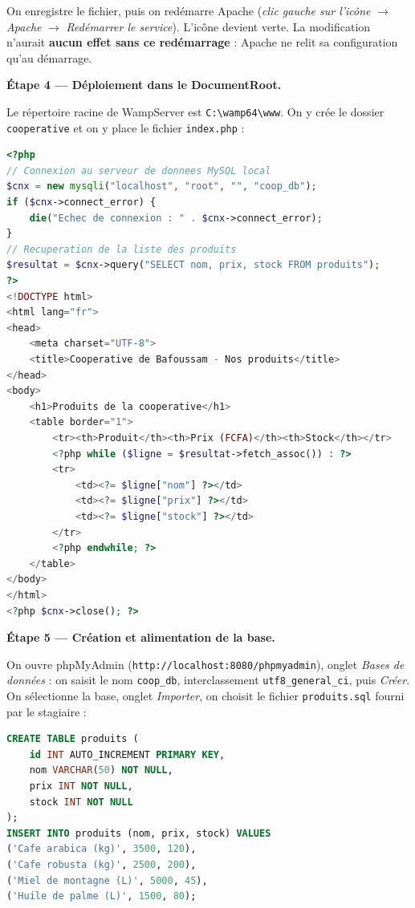 \documentclass[11pt]{article}
\begin{document}
\begin{exoresolu}
On enregistre le fichier, puis on redémarre Apache (\emph{clic gauche sur l'icône} $\rightarrow$ \emph{Apache} $\rightarrow$ \emph{Redémarrer le service}). L'icône devient verte. La modification n'aurait \textbf{aucun effet sans ce redémarrage} : Apache ne relit sa configuration qu'au démarrage.

\textbf{Étape 4 — Déploiement dans le DocumentRoot.}

Le répertoire racine de WampServer est \texttt{C:\textbackslash wamp64\textbackslash www}. On y crée le dossier \texttt{cooperative} et on y place le fichier \texttt{index.php} :

\begin{lstlisting}[language=Php]
<?php
// Connexion au serveur de donnees MySQL local
$cnx = new mysqli("localhost", "root", "", "coop_db");
if ($cnx->connect_error) {
    die("Echec de connexion : " . $cnx->connect_error);
}
// Recuperation de la liste des produits
$resultat = $cnx->query("SELECT nom, prix, stock FROM produits");
?>
<!DOCTYPE html>
<html lang="fr">
<head>
    <meta charset="UTF-8">
    <title>Cooperative de Bafoussam - Nos produits</title>
</head>
<body>
    <h1>Produits de la cooperative</h1>
    <table border="1">
        <tr><th>Produit</th><th>Prix (FCFA)</th><th>Stock</th></tr>
        <?php while ($ligne = $resultat->fetch_assoc()) : ?>
        <tr>
            <td><?= $ligne["nom"] ?></td>
            <td><?= $ligne["prix"] ?></td>
            <td><?= $ligne["stock"] ?></td>
        </tr>
        <?php endwhile; ?>
    </table>
</body>
</html>
<?php $cnx->close(); ?>
\end{lstlisting}

\textbf{Étape 5 — Création et alimentation de la base.}

On ouvre phpMyAdmin (\texttt{http://localhost:8080/phpmyadmin}), onglet \emph{Bases de données} : on saisit le nom \texttt{coop\_db}, interclassement \texttt{utf8\_general\_ci}, puis \emph{Créer}. On sélectionne la base, onglet \emph{Importer}, on choisit le fichier \texttt{produits.sql} fourni par le stagiaire :

\begin{lstlisting}[language=SQL]
CREATE TABLE produits (
    id INT AUTO_INCREMENT PRIMARY KEY,
    nom VARCHAR(50) NOT NULL,
    prix INT NOT NULL,
    stock INT NOT NULL
);
INSERT INTO produits (nom, prix, stock) VALUES
('Cafe arabica (kg)', 3500, 120),
('Cafe robusta (kg)', 2500, 200),
('Miel de montagne (L)', 5000, 45),
('Huile de palme (L)', 1500, 80);
\end{lstlisting}


\end{exoresolu}
\end{document}
